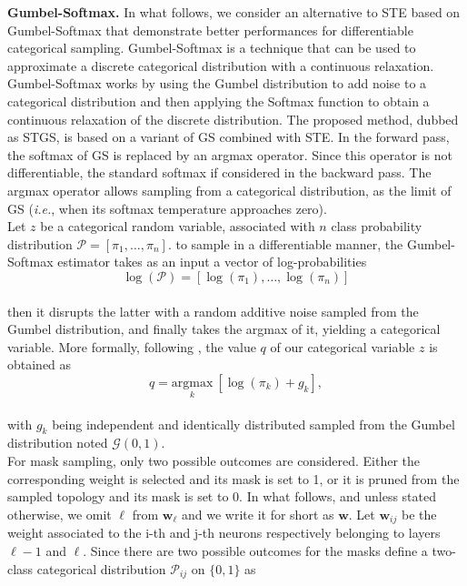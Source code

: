 \noindent\textbf{Gumbel-Softmax.} In what follows, we consider an alternative to
\ac{STE} based on Gumbel-Softmax \cite{DBLP:conf/iclr/JangGP17} that demonstrate
better performances for differentiable categorical sampling. Gumbel-Softmax is a
technique that can be used to approximate a discrete categorical distribution
with a continuous relaxation. Gumbel-Softmax works by using the Gumbel
distribution to add noise to a categorical distribution and then applying the
Softmax function to obtain a continuous relaxation of the discrete distribution.
The proposed method, dubbed as \ac{STGS}, is based on a variant of \ac{GS}
combined with \ac{STE}. In the forward pass, the softmax of \ac{GS} is replaced
by an argmax operator. Since this operator is not differentiable, the standard
softmax if considered in the backward pass. The argmax operator allows sampling
from a categorical distribution, as the limit of \ac{GS} (\emph{i.e.}, when its
softmax temperature approaches zero). \\

Let $z$ be a categorical random variable, associated with $n$ class probability
distribution $\mathcal{P} = [\pi_1,\dots,\pi_n]$. to sample in a
differentiable manner, the Gumbel-Softmax estimator takes as an input a vector
of log-probabilities \\

\begin{equation}
  \label{eqn:chap2:gumbel-softmax-input}
  \log(\mathcal{P}) =[\log(\pi_1),\dots, \log(\pi_n)] 
\end{equation}\\

then it disrupts the latter with a random additive noise sampled from the Gumbel
distribution, and finally takes the argmax of it, yielding a categorical
variable. More formally, following \cite{DBLP:conf/iclr/JangGP17}, the value $q$
of our categorical variable $z$ is obtained as \\

\begin{equation}
  \label{eqn:chap2:gumbel-softmax-argmax}
  q = \underset{k}{ \text{argmax}} \ [ \log(\pi_k)+g_k ],
\end{equation}\\

with $g_k$ being independent and identically distributed sampled from  the
Gumbel distribution noted $\mathcal{G}(0,1)$.\\

For mask sampling, only two possible outcomes are considered. Either the
corresponding weight is selected and its mask is set to 1, or it is pruned
from the sampled topology and its mask is set to 0. In what follows, and
unless stated otherwise, we omit $\ell$ from $\bm{w}_\ell$ and we write it for
short as $\bm{w}$. Let $\bm{w}_{ij}$ be the weight associated to the i-th and
j-th neurons respectively belonging to layers $\ell-1$ and $\ell$. Since there
are two possible outcomes for the masks define a two-class categorical distribution
$\mathcal{P}_{ij}$ on $\{0,1\}$ as\\

